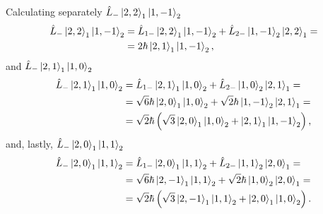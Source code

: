 Calculating separately $\hat{L}_{-} \Ket{2,2}_1 \Ket{1,-1}_2$ 
\begin{align}
    \notag
    \hat{L}_{-} \Ket{2,2}_1 \Ket{1,-1}_2 &=
    \hat{L}_{1-} \Ket{2,2}_1 \Ket{1,-1}_2 
    +
    \hat{L}_{2-} \Ket{1,-1}_2 \Ket{2,2}_1 
    = \\
    &=
    2 \hbar \Ket{2,1}_1 \Ket{1,-1}_2,
\end{align}
and $\hat{L}_{-} \Ket{2,1}_1 \Ket{1,0}_2$
\begin{align}
    \notag
    \hat{L}_{-} \Ket{2,1}_1 \Ket{1,0}_2 &=
    \hat{L}_{1-} \Ket{2,1}_1 \Ket{1,0}_2 
    +
    \hat{L}_{2-} \Ket{1,0}_2 \Ket{2,1}_1 
    = \\
    \notag
    &=
    \sqrt{6} \hbar \Ket{2,0}_1 \Ket{1,0}_2
    +
    \sqrt{2} \hbar \Ket{1,-1}_2 \Ket{2,1}_1
    = \\
    &=
    \sqrt{2} \hbar \left(
        \sqrt{3} \Ket{2,0}_1 \Ket{1,0}_2
        +
        \Ket{2,1}_1 \Ket{1,-1}_2
    \right),
\end{align}
and, lastly, $\hat{L}_{-} \Ket{2,0}_1 \Ket{1,1}_2$
\begin{align}
    \notag
    \hat{L}_{-} \Ket{2,0}_1 \Ket{1,1}_2 &=
    \hat{L}_{1-} \Ket{2,0}_1 \Ket{1,1}_2 
    +
    \hat{L}_{2-} \Ket{1,1}_2 \Ket{2,0}_1 
    = \\
    \notag
    &=
    \sqrt{6} \hbar \Ket{2,-1}_1 \Ket{1,1}_2
    +
    \sqrt{2} \hbar \Ket{1,0}_2 \Ket{2,0}_1
    = \\
    &=
    \sqrt{2} \hbar \left(
        \sqrt{3} \Ket{2,-1}_1 \Ket{1,1}_2
        +
        \Ket{2,0}_1 \Ket{1,0}_2
    \right).
\end{align}

